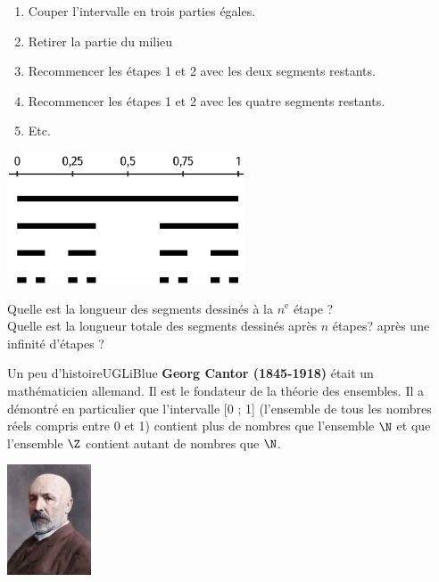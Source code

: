\documentclass[a4paper,11pt,exos]{nsi} %
\begin{document}
\dleft{9.5cm}
{
	\begin{enumerate}[label=\textbullet]
		\item 	Couper l'intervalle en trois parties égales.
		\item 	Retirer la partie du milieu
		\item	Recommencer les étapes 1 et 2 avec les deux segments restants.
		\item	Recommencer les étapes 1 et 2 avec les quatre segments restants.
		\item   Etc.
	\end{enumerate}
	
}
{\includegraphics[width=7cm]{cantor1}}

Quelle est la longueur des segments dessinés à la $n^{\text{e}}$ étape ?\\
 Quelle est la longueur totale des segments dessinés après $n$ étapes? après une infinité d'étapes ?\\

	\begin{minipage}{14cm}
        \begin{encadrecolore}{Un peu d'histoire}{UGLiBlue}
		\textbf{Georg Cantor (1845-1918)} était un mathématicien allemand. Il est le fondateur de la théorie des ensembles. Il a démontré en particulier que l'intervalle [0 ; 1] (l'ensemble de tous les nombres réels compris entre 0 et 1) contient plus de nombres que l'ensemble $\N$ et que l'ensemble $\Z$ contient autant de nombres que $\N$.
    \end{encadrecolore}
	\end{minipage}
	\begin{minipage}{3cm}
		\flushright
		\includegraphics[width=2.5cm]{cantor2}\\
	\end{minipage}
\end{document}
